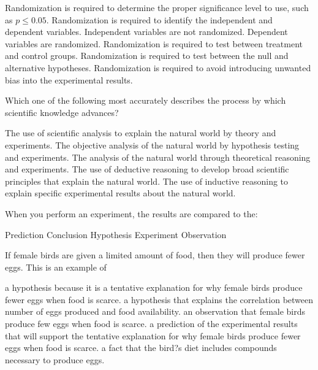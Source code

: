 \begin{choices}
\choice Randomization is required to determine the proper significance level to use, such as $p \le 0.05$.%
\choice Randomization is required to identify the independent and dependent variables. Independent variables are not randomized. Dependent variables are randomized.%
\choice Randomization is required to test between treatment and control groups.%
\choice Randomization is required to test between the null and alternative hypotheses.%
\choice Randomization is required to avoid introducing unwanted bias into the experimental results.%

 
\question
Which one of the following most accurately describes the process by which scientific knowledge advances? 

\begin{choices}
\choice The use of scientific analysis to explain the natural world by theory and experiments.%
\choice The objective analysis of the natural world by hypothesis testing and experiments.%
\choice The analysis of the natural world through theoretical reasoning and experiments.%
\choice The use of deductive reasoning to develop broad scientific principles that explain the natural world.%
\choice The use of inductive reasoning to explain specific experimental results about the natural world.%
\end{choices}

\question
When you perform an experiment, the results are compared to the:

\begin{choices}
\choice Prediction%
\choice Conclusion%
\choice Hypothesis%
\choice Experiment%
\choice Observation %
\end{choices}

\question
If female birds are given a limited amount of food, then they will produce fewer eggs.  This is an example of

\begin{choices}
\choice a hypothesis because it is a tentative explanation for why female birds produce fewer eggs when food is scarce.%
\choice a hypothesis that explains the correlation between number of eggs produced and food availability.%
\choice an observation that female birds produce few eggs when food is scarce.%
\choice a prediction of the experimental results that will support the tentative explanation for why female birds produce fewer eggs when food is scarce.%
\choice a fact that the bird?s diet includes compounds necessary to produce eggs.%
\end{choices}


\end{choices}
